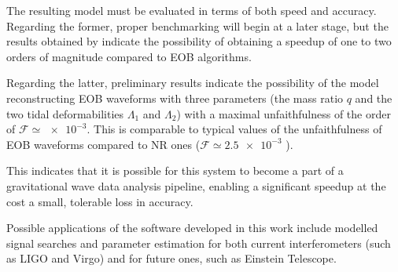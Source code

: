 \documentclass[main.tex]{subfiles}
\begin{document}
The resulting model must be evaluated in terms of both speed and accuracy.
Regarding the former, proper benchmarking will begin at a later stage, but the results obtained by \textcite[]{schmidtMachineLearningGravitational2020} indicate the possibility of obtaining a speedup of one to two orders of magnitude compared to EOB algorithms. 

Regarding the latter, preliminary results indicate the possibility of the model reconstructing \ac{EOB} waveforms with three parameters (the mass ratio \(q\) and the two tidal deformabilities \(\Lambda_1\) and \(\Lambda_2 \)) with a maximal unfaithfulness of the order of \(\mathcal{F} \simeq \num{e-3}\).
This is comparable to typical values of the unfaithfulness of EOB waveforms compared to \ac{NR} ones (\(\mathcal{F} \simeq \num{2.5e-3}\) \cite[]{nagarTimedomainEffectiveonebodyGravitational2018}).

This indicates that it is possible for this system to become a part of a gravitational wave data analysis pipeline, enabling a significant speedup at the cost a small, tolerable loss in accuracy.

Possible applications of the software developed in this work include modelled signal searches and parameter estimation for both current interferometers (such as LIGO and Virgo) and for future ones, such as Einstein Telescope.
\end{document}

